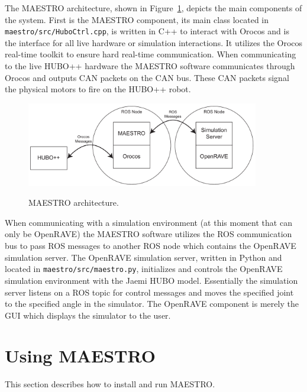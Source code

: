\documentclass{article}
\begin{document}
The MAESTRO architecture, shown in Figure~\ref{fig:maestro-arch},
depicts the main components of the system. First is the MAESTRO
component, its main class located in \texttt{maestro/src/HuboCtrl.cpp},
is written in C++ to interact with Orocos and is the interface for all
live hardware or simulation interactions. It utilizes the Orocos
real-time toolkit to ensure hard real-time communication. When
communicating to the live HUBO++ hardware the MAESTRO software
communicates through Orocos and outputs CAN packets on the CAN bus.
These CAN packets signal the physical motors to fire on the HUBO++
robot.

\begin{figure}[H]
    \centering
    \includegraphics[width=4in]{./maestro-architecture.pdf}
    \label{fig:maestro-arch}
    \caption{MAESTRO architecture.}
\end{figure}

When communicating with a simulation environment (at this moment that
can only be OpenRAVE) the MAESTRO software utilizes the ROS
communication bus to pass ROS messages to another ROS node which
contains the OpenRAVE simulation server. The OpenRAVE simulation server,
written in Python and located in \texttt{maestro/src/maestro.py},
initializes and controls the OpenRAVE simulation environment with the
Jaemi HUBO model. Essentially the simulation server listens on a ROS topic for
control messages and moves the specified joint to the specified angle in
the simulator. The OpenRAVE component is merely the GUI which displays
the simulator to the user.

\section{Using MAESTRO}
This section describes how to install and run MAESTRO.
\end{document}
